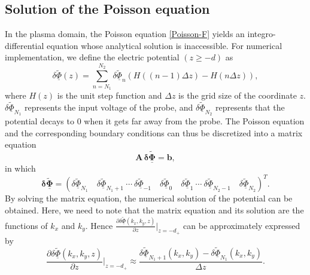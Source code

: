 \documentclass[superscriptaddress,preprint]{revtex4}  %
\begin{document}
\subsection{Solution of the Poisson equation}
In the plasma domain, the Poisson equation \eqref{Poisson-F} yields an integro-differential equation whose analytical solution is inaccessible. For numerical implementation, we define the electric potential $(z\geq -d)$ as
\begin{equation}
\delta\underline{\tilde{\Phi}}(z) = \sum_{n=N_1}^{N_2} \delta\underline{\tilde{\Phi}}_n \left(H((n-1)\Delta z)-H(n\Delta z)\right),
\end{equation}
where $H(z)$ is the unit step function and $\Delta z$ is the grid size of the coordinate $z$. $\delta\underline{\tilde{\Phi}}_{N_1}$ represents the input voltage of the probe, and $\delta\underline{\tilde{\Phi}}_{N_2}$ represents that the potential decays to $0$ when it gets far away from the probe. The Poisson equation and the corresponding boundary conditions can thus be discretized into a matrix equation
\begin{equation}
\mathbf{A} \, \mathbf{\delta\underline{\tilde{\Phi}}}=\mathbf{b},
\label{matrix-eq}
\end{equation}
in which
\begin{equation}
\mathbf{\delta\underline{\tilde{\Phi}}}=\left( \delta\underline{\tilde{\Phi}}_{N_1} \quad \delta\underline{\tilde{\Phi}}_{N_1+1} \ \cdots \ \delta\underline{\tilde{\Phi}}_{-1} \quad \delta\underline{\tilde{\Phi}}_{0} \quad \delta\underline{\tilde{\Phi}}_{1} \ \cdots \ \delta\underline{\tilde{\Phi}}_{N_2-1}  \quad \delta\underline{\tilde{\Phi}}_{N_2} 
\right)^{T}.
\end{equation}
By solving the matrix equation, the numerical solution of the potential can be obtained. Here, we need to note that the matrix equation and its solution are the functions of $k_x$ and $k_y$. Hence $\displaystyle{\frac{\partial\delta\underline{\tilde{\Phi}}(k_x,k_y,z)}{\partial z}\bigg|_{z=-d_+}}$ can be approximately expressed by
\begin{equation}
\frac{\partial\delta\underline{\tilde{\Phi}}(k_x,k_y,z)}{\partial z}\bigg|_{z=-d_+} \approx 
\frac{\delta\underline{\tilde{\Phi}}_{N_1+1}(k_x,k_y) - \delta\underline{\tilde{\Phi}}_{N_1}(k_x,k_y) }{\Delta z}.
\label{eq:z=-d}
\end{equation}
\end{document}
